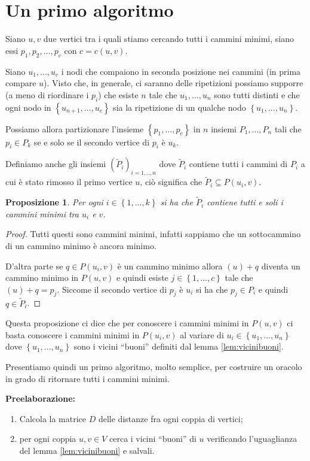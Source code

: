\documentclass[a4paper,10pt]{amsbook}
\newcounter{counter1}
\theoremstyle{plain}
\newtheorem{mypro}[counter1]{Proposizione}
\theoremstyle{definition}
\theoremstyle{remark}
\newcommand{\set}[1]{\left\{#1\right\}}
\newcommand{\pa}[1]{\left(#1\right)}
\begin{document}
\section{Un primo algoritmo}
\label{sec:camminibanale}

Siano $u,v$ due vertici tra i quali stiamo cercando tutti i cammini
minimi, siano essi $p_1,p_2,...,p_c$ con $c = c(u,v)$.

Siano $u_1,..., u_c$ i nodi che compaiono in seconda posizione nei
cammini (in prima compare $u$). Visto che, in generale, ci saranno
delle ripetizioni possiamo supporre (a meno di riordinare i $p_i$) che
esiste $n$ tale che $u_1,...,u_n$ sono tutti distinti e che ogni nodo
in $\set{ u_{n+1},..., u_c}$ sia la ripetizione di un qualche nodo
$\set{ u_1,..., u_n}$.

Possiamo allora partizionare l'insieme $\set{p_1,... ,p_c}$ in $n$
insiemi $P_1, ..., P_n$ tali che $p_i \in P_k$ se e solo se il secondo
vertice di $p_i$ \`e $u_k$.

Definiamo anche gli insiemi $\pa{ \tilde P_i} _{i=1,..,n}$ dove
$\tilde P_i$ contiene tutti i cammini di $P_i$ a cui \`e stato rimosso
il primo vertice $u$, ci\`o significa che $\tilde P _i \subseteq P\pa{
  u_i, v}$.

\begin{mypro}
  Per ogni $i \in \set{ 1,...,k}$ si ha che $\tilde P _i$ contiene
  tutti e soli i cammini minimi tra $u_i$ e $v$.
\end{mypro}
\begin{proof}
  Tutti questi sono cammini minimi, infatti sappiamo che un
  sottocammino di un cammino minimo \`e ancora minimo.

  D'altra parte se $q \in P(u_i,v)$ \`e un cammino minimo allora $(u)
  + q$ diventa un cammino minimo in $P(u,v)$ e quindi esiste $j \in
  \set{ 1,...,c}$ tale che $(u) +q = p_j$. Siccome il secondo vertice
  di $p_j$ \`e $u_i$ si ha che $p_j \in P_i$ e quindi $q \in \tilde P
  _i$.
\end{proof}

Questa proposizione ci dice che per conoscere i cammini minimi in
$P(u,v)$ ci basta conoscere i cammini minimi in $P(u_i,v)$ al variare
di $u_i \in \set{ u_1,..., u_n}$ dove $\set{ u_1,..., u_n}$ sono i
vicini ``buoni'' definiti dal lemma \ref{lem:vicinibuoni}.

Presentiamo quindi un primo algoritmo, molto semplice, per costruire
un oracolo in grado di ritornare tutti i cammini minimi.

\textbf{Preelaborazione:}
\begin{enumerate}
\item Calcola la matrice $D$ delle distanze fra ogni coppia di vertici;
\item per ogni coppia $u,v\in V$ cerca i vicini ``buoni'' di $u$
  verificando l'uguaglianza del lemma \ref{lem:vicinibuoni} e salvali.
\end{enumerate}
\end{document}
